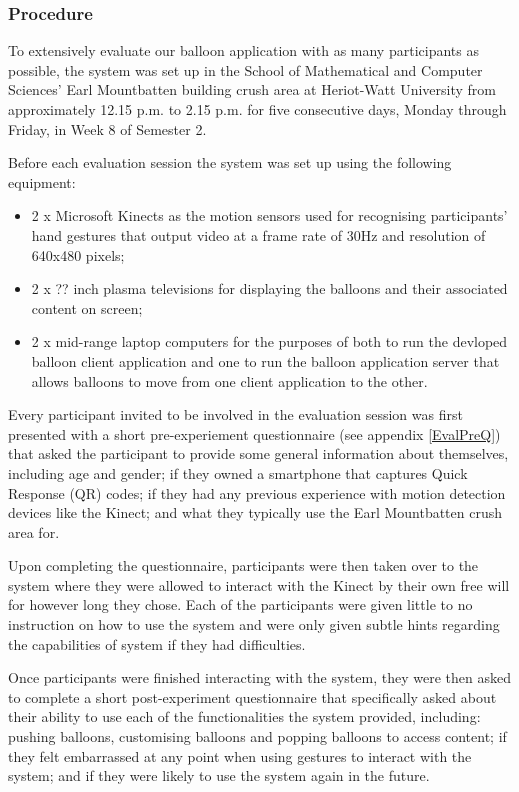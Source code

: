 \subsubsection{Procedure}

To extensively evaluate our balloon application with as many participants as possible, the system was set up in the School of Mathematical and Computer Sciences'  Earl Mountbatten building crush area at Heriot-Watt University from approximately 12.15 p.m. to 2.15 p.m. for five consecutive days, Monday through Friday, in Week 8 of Semester 2.

Before each evaluation session the system was set up using the following equipment:
\begin{itemize}
\item{2 x Microsoft Kinects as the motion sensors used for recognising participants' hand gestures that output video at a frame rate of 30Hz and resolution of 640x480 pixels;}
\item{2 x ?? inch plasma televisions for displaying the balloons and their associated content on screen; }
\item{2 x mid-range laptop computers for the purposes of both to run the devloped balloon client application and one to run the balloon application server that allows balloons to move from one client application to the other.}
\end{itemize}

Every participant invited to be involved in the evaluation session was first presented with a short pre-experiement questionnaire (see appendix \vref{EvalPreQ}) that asked the participant to provide some general information about themselves, including age and gender; if they owned a smartphone that captures Quick Response (QR) codes; if they had any previous experience with motion detection devices like the Kinect; and what they typically use the Earl Mountbatten crush area for.

Upon completing the questionnaire, participants were then taken over to the system where they were allowed to interact with the Kinect by their own free will for however long they chose. Each of the participants were given little to no instruction on how to use the system and were only given subtle hints regarding the capabilities of system if they had difficulties.

Once participants were finished interacting with the system, they were then asked to complete a short post-experiment questionnaire that specifically asked about their ability to use each of the functionalities the system provided, including: pushing balloons, customising balloons and popping balloons to access content; if they felt embarrassed at any point when using gestures to interact with the system; and if they were likely to use the system again in the future.

